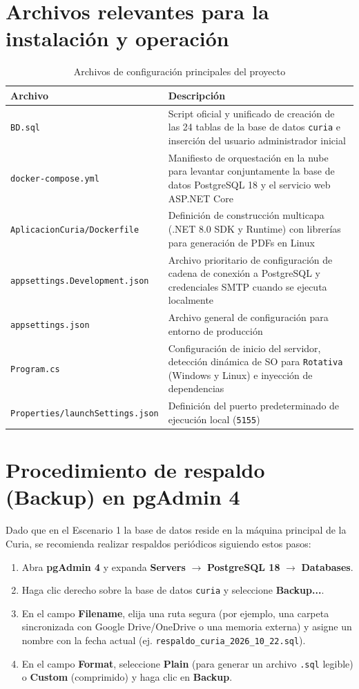 \section{Archivos relevantes para la instalación y operación}
\begin{table}[h]
    \centering
    \begin{tabular}{|l|p{9.5cm}|}
        \hline
        \textbf{Archivo} & \textbf{Descripción} \\ \hline
        \texttt{BD.sql} & Script oficial y unificado de creación de las 24 tablas de la base de datos \texttt{curia} e inserción del usuario administrador inicial \\ \hline
        \texttt{docker-compose.yml} & Manifiesto de orquestación en la nube para levantar conjuntamente la base de datos PostgreSQL 18 y el servicio web ASP.NET Core \\ \hline
        \texttt{AplicacionCuria/Dockerfile} & Definición de construcción multicapa (.NET 8.0 SDK y Runtime) con librerías para generación de PDFs en Linux \\ \hline
        \texttt{appsettings.Development.json} & Archivo prioritario de configuración de cadena de conexión a PostgreSQL y credenciales SMTP cuando se ejecuta localmente \\ \hline
        \texttt{appsettings.json} & Archivo general de configuración para entorno de producción \\ \hline
        \texttt{Program.cs} & Configuración de inicio del servidor, detección dinámica de SO para \texttt{Rotativa} (Windows y Linux) e inyección de dependencias \\ \hline
        \texttt{Properties/launchSettings.json} & Definición del puerto predeterminado de ejecución local (\texttt{5155}) \\ \hline
    \end{tabular}
    \caption{Archivos de configuración principales del proyecto}
\end{table}

\section{Procedimiento de respaldo (Backup) en pgAdmin 4}
Dado que en el Escenario 1 la base de datos reside en la máquina principal de la Curia, se recomienda realizar respaldos periódicos siguiendo estos pasos:
\begin{enumerate}
    \item Abra \textbf{pgAdmin 4} y expanda \textbf{Servers} $\rightarrow$ \textbf{PostgreSQL 18} $\rightarrow$ \textbf{Databases}.
    \item Haga clic derecho sobre la base de datos \texttt{curia} y seleccione \textbf{Backup...}.
    \item En el campo \textbf{Filename}, elija una ruta segura (por ejemplo, una carpeta sincronizada con Google Drive/OneDrive o una memoria externa) y asigne un nombre con la fecha actual (ej. \texttt{respaldo\_curia\_2026\_10\_22.sql}).
    \item En el campo \textbf{Format}, seleccione \textbf{Plain} (para generar un archivo \texttt{.sql} legible) o \textbf{Custom} (comprimido) y haga clic en \textbf{Backup}.
\end{enumerate}
